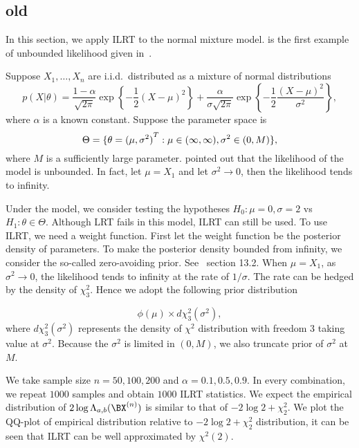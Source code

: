 
\subsection{old}

 In this section, we apply ILRT to the normal mixture model.
 is the first example of unbounded likelihood given in~\cite{Cam1990Maximum}.


Suppose $X_1,\ldots,X_n$ are i.i.d.\ distributed as a mixture of normal distributions
\begin{equation}
    p(X|\theta)=\frac{1-\alpha}{\sqrt{2\pi}}\exp\left\{-\frac{1}{2}{(X-\mu)}^2\right\}+
    \frac{\alpha}{\sigma\sqrt{2\pi}}\exp\left\{-\frac{1}{2}\frac{{(X-\mu)}^2}{\sigma^2}\right\},
\end{equation}
 where $\alpha$ is a known constant. Suppose the parameter space is
\begin{equation}
    \Theta=\{\theta={(\mu,\sigma^2)}^T:\mu\in(\-\infty,\infty),\sigma^2\in (0,M)\},
\end{equation}
where $M$ is a sufficiently large parameter.
\cite{Cam1990Maximum} pointed out that the likelihood of the model is unbounded. In fact, let $\mu=X_1$ and let $\sigma^2\to 0$, then the likelihood tends to infinity.

Under the model, we consider testing the hypotheses $H_0:\mu=0,\sigma=2$ vs $H_1:\theta\in
\Theta$. Although LRT fails in this model, ILRT can still be used. To use ILRT, we need a weight function.
First let the weight function be the posterior density of parameters. To make the posterior density bounded from infinity, we consider the so-called zero-avoiding prior. See~\cite{bayesianDataAnalysis} section 13.2.
When $\mu=X_1$, as $\sigma^2\to 0$, the likelihood tends to infinity at the rate of ${1}/{\sigma}$. The rate can be hedged by the density of $\chi^2_3$. Hence we adopt the following prior distribution

\begin{equation}
    \phi(\mu)\times d\chi^2_3(\sigma^2),
\end{equation}
where $d\chi^2_3(\sigma^2)$ represents the density of $\chi^2$ distribution with freedom $3$ taking value at $\sigma^2$. Because the $\sigma^2$ is limited in $(0,M)$, we also truncate prior of $\sigma^2$ at $M$.

 We take sample size $n=50,100,200$ and $\alpha=0.1,0.5,0.9$. In every combination, we repeat $1000$ samples and obtain $1000$ ILRT statistics.
 We expect the empirical distribution of $2\log \Lambda_{a,b}(\BX^{(n)})$ is similar to that of $-2\log 2+\chi^2_2$.
 We plot the QQ-plot of empirical distribution relative to  $-2\log 2+\chi^2_2$ distribution, it can be seen that ILRT can be well approximated by $\chi^2(2)$.

